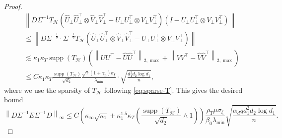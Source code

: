\documentclass[12pt]{article}
\newcommand{\norm}[1]{\left\lVert#1\right\rVert}
\def\calH{{\mathcal H}}
\theoremstyle{plain}
\begin{document}
\begin{proof}
\begin{equation*}
    \begin{aligned}
      &\norm{D\Sigma^{-1}T_{\calH}\left(\widehat U_\perp \widehat U_\perp^\top \otimes \widehat V_\perp \widehat V_\perp^\top - U_\perp U_\perp^\top \otimes V_\perp V_\perp^\top\right) \left(I-U_\perp U_\perp^\top \otimes V_\perp V_\perp^\top\right)}  \\
      & \le \norm{D\Sigma^{-\frac{1}{2} }\cdot \Sigma^{-\frac{1}{2} }T_{\calH}\left(\widehat U_\perp \widehat U_\perp^\top \otimes \widehat V_\perp \widehat V_\perp^\top - U_\perp U_\perp^\top \otimes V_\perp V_\perp^\top\right)}\\
          &  \lesssim {\kappa_1}\kappa_T\operatorname{supp}(T_{\calH} )  \left(\norm{UU^\top-\widehat{U}\widehat{U}^\top }_{2,\max} + \norm{VV^\top-\widehat{V}\widehat{V}^\top }_{2,\max} \right)  \\
          & \le C \kappa_1\kappa_T\frac{\operatorname{supp}(T_{\calH} )}{\sqrt{d_2}} \frac{\sqrt{\tau}\left(1+\gamma_{n}\right) \sigma_{\xi}}{\lambda_{\min}} \cdot \sqrt{\frac{d_1^2 d_2 \log d_1}{n}},
    \end{aligned}
\end{equation*}
where we use the sparsity of $T_{\calH}$ following \eqref{eq:sparse-T}. This gives the desired bound 
\begin{equation*}
    \norm{{D}{\Sigma}^{-1}E{\Sigma}^{-1}{D}}_\infty \le C\left(\kappa_\infty\sqrt{\kappa_1} +\kappa_1^{1.5}\kappa_T\left( \frac{\operatorname{supp}(T_{\calH} )}{\sqrt{d_2}}\wedge 1 \right)  \right)\frac{\rho_T \mu \sigma_\xi }{\beta_0 \lambda_{\min} }\sqrt{\frac{\alpha_d q d_1^2 d_2 \log d_1 }{n}}.
\end{equation*}

\end{proof}
\end{document}

